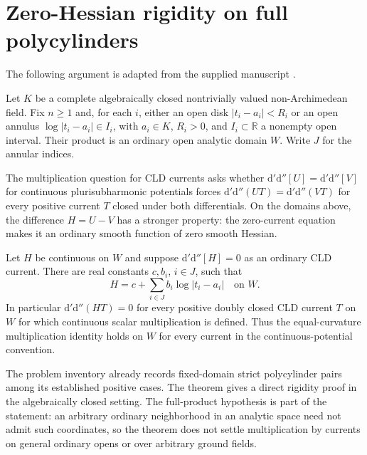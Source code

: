\section{Zero-Hessian rigidity on full polycylinders}
\label{sec:supplied-p213}

The following argument is adapted from the supplied manuscript
\cite{SuppliedP21320260924}.


Let $K$ be a complete algebraically closed nontrivially valued non-Archimedean field. Fix $n\geq1$ and, for each $i$, either an open disk $|t_i-a_i|<R_i$ or an open annulus $\log|t_i-a_i|\in I_i$, with $a_i\in K$, $R_i>0$, and $I_i\subset\mathbb R$ a nonempty open interval. Their product is an ordinary open analytic domain $W$. Write $J$ for the annular indices.

The multiplication question for CLD currents asks whether $\mathrm d'\mathrm d''[U]=\mathrm d'\mathrm d''[V]$ for continuous plurisubharmonic potentials forces $\mathrm d'\mathrm d''(UT)=\mathrm d'\mathrm d''(VT)$ for every positive current $T$ closed under both differentials. On the domains above, the difference $H=U-V$ has a stronger property: the zero-current equation makes it an ordinary smooth function of zero smooth Hessian.

\begin{theorem}\label{thm:supplied-p213-polycylinder-rigidity}
Let $H$ be continuous on $W$ and suppose $\mathrm d'\mathrm d''[H]=0$ as an ordinary CLD current. There are real constants $c,b_i$, $i\in J$, such that
\begin{equation}\label{eq:supplied-p213-affine-form}
 H=c+\sum_{i\in J}b_i\log|t_i-a_i|\quad\text{on }W.
\end{equation}
In particular $\mathrm d'\mathrm d''(HT)=0$ for every positive doubly closed CLD current $T$ on $W$ for which continuous scalar multiplication is defined. Thus the equal-curvature multiplication identity holds on $W$ for every current in the continuous-potential convention.
\end{theorem}

The problem inventory already records fixed-domain strict polycylinder pairs among its established positive cases. The theorem gives a direct rigidity proof in the algebraically closed setting. The full-product hypothesis is part of the statement: an arbitrary ordinary neighborhood in an analytic space need not admit such coordinates, so the theorem does not settle multiplication by currents on general ordinary opens or over arbitrary ground fields.

